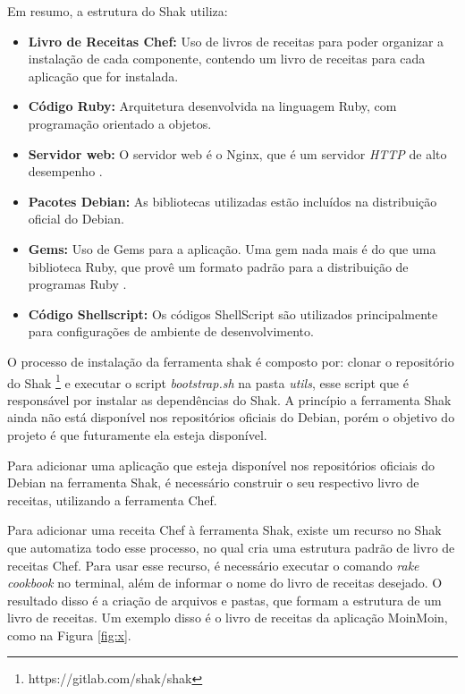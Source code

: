 Em resumo, a estrutura do Shak utiliza:

\begin{itemize}
  \item  \textbf{Livro de Receitas Chef:} Uso de livros de receitas
  para poder organizar a instalação de cada componente, contendo um livro
  de receitas para cada aplicação que for instalada.
  \item  \textbf{Código Ruby:} Arquitetura desenvolvida na linguagem
  Ruby, com programação orientado a objetos.
  \item  \textbf{Servidor web:} O servidor web é o Nginx, que é um
  servidor \textit{HTTP} de alto desempenho \cite{nginx}.
  \item  \textbf{Pacotes Debian:} As bibliotecas utilizadas estão incluídos na distribuição
  oficial do Debian.
  \item  \textbf{Gems:} Uso de Gems para a aplicação. Uma gem nada mais é do 
que uma biblioteca Ruby, que provê um formato padrão para
  a distribuição de programas Ruby \cite{gem}.
  \item  \textbf{Código Shellscript:} Os códigos ShellScript são utilizados
  principalmente para configurações de ambiente de desenvolvimento. 
\end{itemize}

O processo de instalação da ferramenta shak é composto por: clonar o repositório
do Shak \footnote{https://gitlab.com/shak/shak} e executar o script \textit{bootstrap.sh} na
pasta \textit{utils}, esse script que é responsável por instalar as dependências do Shak. A princípio a ferramenta
Shak ainda não está disponível nos repositórios oficiais do Debian, porém o objetivo do projeto 
é que futuramente ela esteja disponível.

Para adicionar uma aplicação que esteja disponível nos repositórios oficiais
do Debian na ferramenta Shak, é necessário construir o seu respectivo 
livro de receitas, utilizando a ferramenta Chef. 

Para adicionar uma receita Chef à ferramenta Shak, existe um recurso no Shak que
automatiza todo esse processo, no qual cria uma estrutura padrão de livro de receitas
Chef. Para usar esse recurso, é necessário executar o comando \textit{rake cookbook}
no terminal, além de informar o nome do livro de receitas desejado. O resultado
disso é a criação de arquivos e pastas, que formam a estrutura de um livro de receitas. Um
exemplo disso é o livro de receitas da aplicação MoinMoin, como na Figura \ref{fig:x}. 

